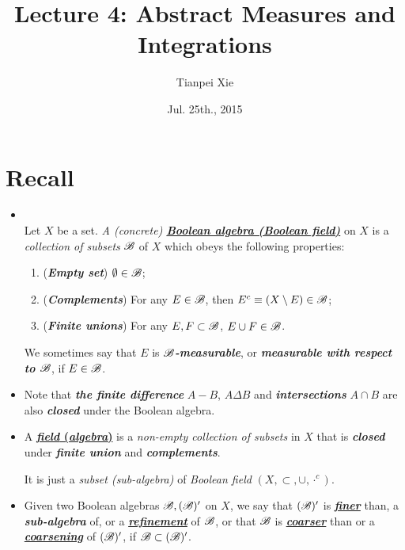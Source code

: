 \documentclass[11pt]{article}
\begin{document}
\title{Lecture 4:  Abstract Measures and Integrations}
\author{ Tianpei Xie}
\date{ Jul. 25th., 2015 }
\maketitle
\tableofcontents
\newpage
\section{Recall}
\begin{itemize}
\item \begin{definition} \citep{tao2011introduction}\\
Let $X$ be a set. \emph{A (concrete) \underline{\textbf{Boolean algebra (Boolean field)}}} on $X$ is a \emph{collection of subsets} ${\mathscr B}$ of $X$ which obeys the following
properties:
\begin{enumerate}
\item (\textbf{\emph{Empty set}}) $\emptyset \in {\mathscr B}$;
\item (\textbf{\emph{Complements}}) For any $E\in {\mathscr B}$, then $E^{c}\equiv (X \setminus E) \in {\mathscr B}$;
\item (\textbf{\emph{Finite unions}}) For any  $E, F \subset {\mathscr B}$, $E\cup F \in {\mathscr B}$.
\end{enumerate}
We sometimes say that $E$ is \textbf{\emph{${\mathscr B}$-measurable}}, or \textbf{\emph{measurable with respect to ${\mathscr B}$}}, if $E \in {\mathscr B}$.
\end{definition}

\item \begin{remark}
Note that \emph{\textbf{the finite difference}} $A-B$, $A\Delta B$ and \emph{\textbf{intersections}} $A\cap B$ are also \emph{\textbf{closed}} under the Boolean algebra. 
\end{remark}

\item \begin{definition}
A \underline{\textbf{\emph{field} (\emph{algebra})}} is a \emph{non-empty collection of subsets} in $X$ that is \emph{\textbf{closed}} under \emph{\textbf{finite union}} and \emph{\textbf{complements}}. 

It is just a \emph{subset (sub-algebra)} of \emph{Boolean field} $(X, \subset, \cup, \cdot^{c})$. 
\end{definition} 

\item \begin{definition}
Given two Boolean algebras ${\mathscr B}, ({\mathscr B})'$ on $X$, we say that $({\mathscr B})'$ is \underline{\emph{\textbf{finer}}} than, a \emph{\textbf{sub-algebra}} of, or a \underline{\emph{\textbf{refinement}}} of ${\mathscr B}$, or that ${\mathscr B}$ is \underline{\emph{\textbf{coarser}}} than or a \underline{\emph{\textbf{coarsening}}} of $({\mathscr B})'$, if ${\mathscr B} \subset ({\mathscr B})'$.
\end{definition}


\end{itemize}
\end{document}
